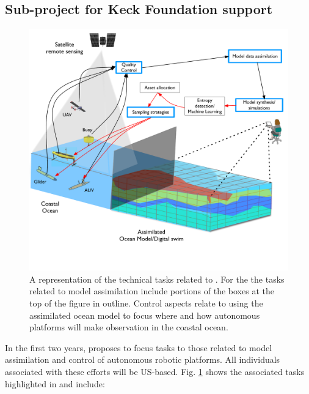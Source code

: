 \subsection{Sub-project for Keck Foundation support}

\begin{figure}[H]
  \centering
  \includegraphics[scale=0.6]{fig/Audacious-pilot-block-diag-2.pdf}
  \caption{A representation of the technical tasks related to \proe. For
    the \kck the tasks related to model assimilation include portions of
    the boxes at the top of the figure in {\color{blue}{blue}}
    outline. Control aspects relate to using the assimilated ocean model
    to focus where and how autonomous platforms will make observation in
    the coastal ocean.}
    \label{fig:block-diag}
\end{figure}

In the first two years, \pro proposes to focus tasks to those related to
model assimilation and control of autonomous robotic platforms. All
individuals associated with these efforts will be US-based.
Fig. \ref{fig:block-diag} shows the associated tasks highlighted in
{\color{blue}{blue}} and include:

